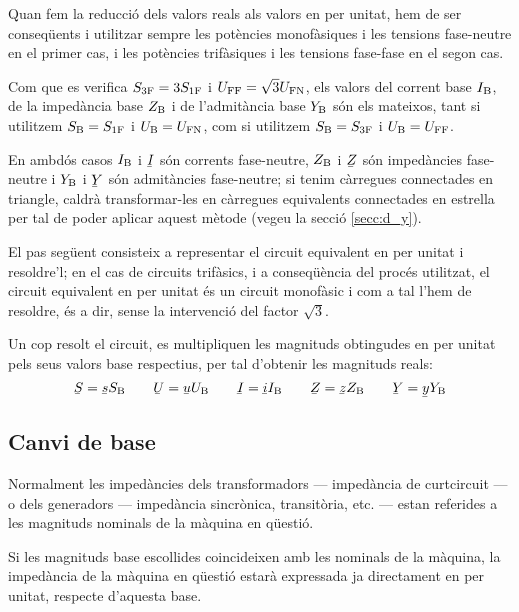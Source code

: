  Quan fem la reducció dels valors reals als valors en per unitat, hem de ser conseqüents i utilitzar sempre les potències monofàsiques i les tensions fase-neutre en el primer cas, i les potències trifàsiques i les tensions fase-fase en el segon cas.

 Com que es verifica $S_\mathrm{3F}=3 S_\mathrm{1F}$ i $U_\mathrm{FF}=\sqrt{3}U_\mathrm{FN}$, els valors  del corrent base $I_\mathrm{B}$, de la impedància base $Z_\mathrm{B}$ i  de l'admitància base $Y_\mathrm{B}$ són els mateixos, tant si utilitzem $S_\mathrm{B}=S_\mathrm{1F}$ i $U_\mathrm{B}=U_\mathrm{FN}$, com si utilitzem $S_\mathrm{B}=S_\mathrm{3F}$ i $U_\mathrm{B}=U_\mathrm{FF}$.

 En ambdós casos $I_\mathrm{B}$ i $\cmplx{I}$ són corrents fase-neutre, $Z_\mathrm{B}$ i $\cmplx{Z}$ són impedàncies  fase-neutre i $Y_\mathrm{B}$ i $\cmplx{Y}$ són admitàncies fase-neutre; si tenim càrregues connectades en triangle, caldrà transformar-les en càrregues equivalents connectades en estrella per tal de poder aplicar aquest mètode (vegeu la secció \ref{secc:d_y}).

El pas següent consisteix a representar el circuit equivalent en
per unitat i resoldre'l; en el cas de circuits trifàsics, i a conseqüència del procés utilitzat, el circuit equivalent en per unitat és un circuit monofàsic i com a tal l'hem de resoldre, és a dir, sense la intervenció del factor $\sqrt{3}$.

Un cop resolt el circuit, es multipliquen les magnituds obtingudes en per unitat pels
seus valors base respectius, per tal d'obtenir les magnituds reals:
\begin{equation}
   \cmplx{S} = \cmplx{s} S\ped{B} \qquad \cmplx{U} = \cmplx{u} U\ped{B} \qquad \cmplx{I} = \cmplx{i} I\ped{B} \qquad \cmplx{Z} = \cmplx{z} Z\ped{B} \qquad \cmplx{Y} = \cmplx{y} Y\ped{B}
\end{equation}

\subsection{Canvi de base}\label{sec:canvi-base} 

Normalment les impedàncies dels transformadors --- impedància de curtcircuit --- o dels generadors --- impedància sincrònica, transitòria, etc. --- estan referides a les magnituds nominals de la màquina en qüestió.


Si les magnituds base escollides coincideixen amb les nominals de la màquina,
la impedància de la màquina en qüestió estarà expressada ja directament en per unitat, respecte d'aquesta base.

